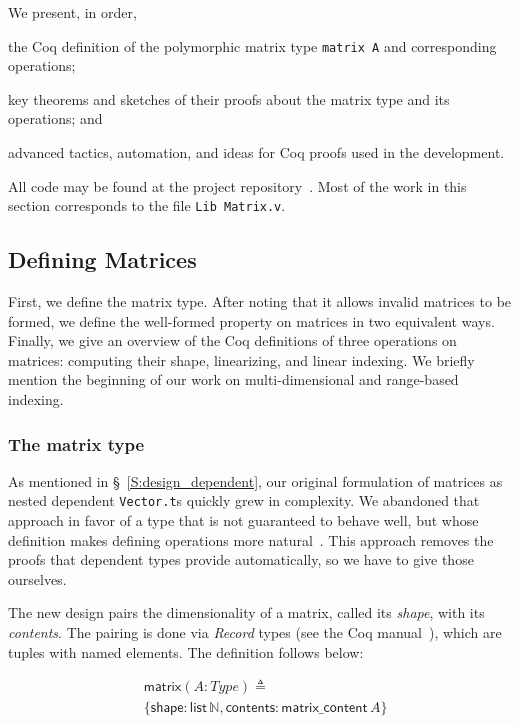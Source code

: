 \documentclass[11pt,conference]{IEEEtran}
\newcommand{\var}[1]{\mathit{#1}}
\newcommand{\func}[1]{\mathsf{#1}}
\theoremstyle{plain} %
\theoremstyle{definition}
\theoremstyle{remark}
\begin{document}
We present, in order,
\begin{inlist}
\item the Coq definition of the polymorphic matrix type \texttt{matrix A} and
    corresponding operations;
\item key theorems and sketches of their proofs about the matrix type and its
    operations; and
\item advanced tactics, automation, and ideas for Coq proofs used in the
    development.
\end{inlist}


All code may be found at the project repository~\cite{zelda_mosaic_proof}. Most
of the work in this section corresponds to the file \texttt{Lib Matrix.v}.

\subsection{Defining Matrices}\label{S:matrix_defn}

First, we define the matrix type. After noting that it allows invalid matrices
to be formed, we define the well-formed property on matrices in two equivalent
ways. Finally, we give an overview of the Coq definitions of three operations on
matrices: computing their shape, linearizing, and linear indexing. We briefly
mention the beginning of our work on multi-dimensional and range-based indexing.

\subsubsection{The matrix type}

As mentioned in \S~\ref{S:design_dependent}, our original formulation of
matrices as nested dependent \texttt{Vector.t}s quickly grew in complexity.
We abandoned that approach in favor of a type that is not guaranteed to behave
well, but whose definition makes defining operations more
natural~\cite{SO_2021_2}. This approach removes the proofs that dependent types
provide automatically, so we have to give those ourselves.

The new design pairs the dimensionality of a matrix, called its \emph{shape},
with its \emph{contents}. The pairing is done via \emph{Record} types (see the
Coq manual~\cite{Coq}), which are tuples with named elements. The definition
follows below:

\begin{align*}
    & \func{matrix} (\var{A}: \var{Type}) \triangleq \\
    & \{
        \func{shape}: \func{list}\, \mathbb{N},
        \func{contents}: \func{matrix\_content}\, \var{A}
    \}
\end{align*}
\end{document}

